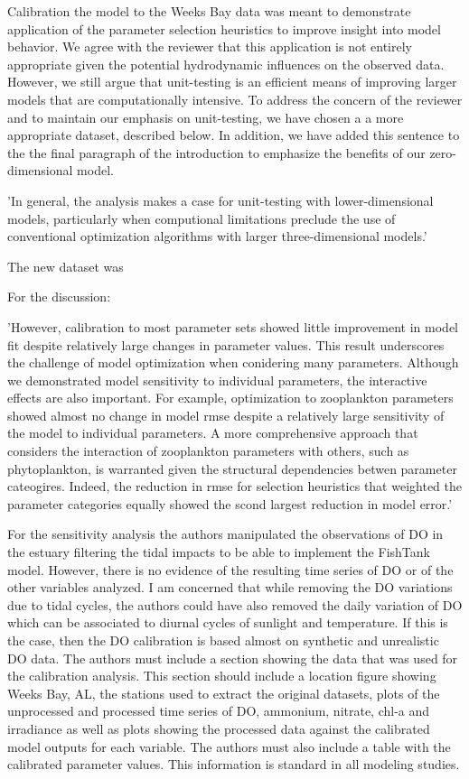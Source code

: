 \documentclass[letterpaper,12pt]{article}\usepackage[]{graphicx}\usepackage[]{color}
\begin{document}
{\it

Calibration the model to the Weeks Bay data was meant to demonstrate application of the parameter selection heuristics to improve insight into model behavior.  We agree with the reviewer that this application is not entirely appropriate given the potential hydrodynamic influences on the observed data. However, we still argue that unit-testing is an efficient means of improving larger models that are computationally intensive.  To address the concern of the reviewer and to maintain our emphasis on unit-testing, we have chosen a a more appropriate dataset, described below.  In addition, we have added this sentence to the the final paragraph of the introduction to emphasize the benefits of our zero-dimensional model.  

'In general, the analysis makes a case for unit-testing with lower-dimensional models, particularly when computional limitations preclude the use of conventional optimization algorithms with larger three-dimensional models.'

The new dataset was 

For the discussion:

'However, calibration to most parameter sets showed little improvement in model fit despite relatively large changes in parameter values.  This result underscores the challenge of model optimization when conidering many parameters.  Although we demonstrated model sensitivity to individual parameters, the interactive effects are also important.  For example, optimization to zooplankton parameters showed almost no change in model \ac{rmse} despite a relatively large sensitivity of the model to individual parameters.  A more comprehensive approach that considers the interaction of zooplankton parameters with others, such as phytoplankton, is warranted given the structural dependencies betwen parameter cateogires.  Indeed, the reduction in \ac{rmse} for selection heuristics that weighted the parameter categories equally showed the scond largest reduction in model error.'
}

For the sensitivity analysis the authors manipulated the observations of DO in the estuary filtering the tidal impacts to be able to implement the FishTank model. However, there is no evidence of the resulting time series of DO or of the other variables analyzed. I am concerned that while removing the DO variations due to tidal cycles, the authors could have also removed the daily variation of DO which can be associated to diurnal cycles of sunlight and temperature. If this is the case, then the DO calibration is based almost on synthetic and unrealistic DO data. The authors must include a section showing the data that was used for the calibration analysis. This section should include a location figure showing Weeks Bay, AL, the stations used to extract the original datasets, plots of the unprocessed and processed time series of DO, ammonium, nitrate, chl-a and irradiance as well as plots showing the processed data against the calibrated model outputs for each variable. The authors must also include a table with the calibrated parameter values. This information is standard in all modeling studies.
\end{document}
